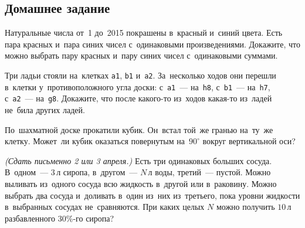 

\subsection*{Домашнее задание}



\begin{problems}

\item
Натуральные числа от~1 до~2015 покрашены в~красный и~синий цвета.
Есть пара красных и~пара синих чисел с~одинаковыми произведениями.
Докажите, что можно выбрать пару красных и~пару синих чисел с~одинаковыми
суммами.

Три ладьи стояли на~клетках \texttt{a1}, \texttt{b1} и~\texttt{a2}.
За~несколько ходов они перешли в~клетки у~противоположного угла доски:
с~\texttt{a1}~--- на~\texttt{h8},
с~\texttt{b1}~--- на~\texttt{h7},
с~\texttt{a2}~--- на~\texttt{g8}.
Докажите, что после какого-то из~ходов какая-то из~ладей не~била других ладей.

\item
По~шахматной доске прокатили кубик.
Он~встал той~же гранью на~ту~же клетку.
Может~ли кубик оказаться повернутым на~$90^\circ$ вокруг вертикальной оси?

\item
\emph{(Сдать письменно 2 или 3 апреля.)}
Есть три одинаковых больших сосуда.
В~одном~--- $3\,\text{л}$ сиропа, в~другом~--- $N\,\text{л}$ воды,
третий~--- пустой.
Можно выливать из~одного сосуда всю жидкость в~другой или в~раковину.
Можно выбрать два сосуда и~доливать в~один из~них из~третьего, пока уровни
жидкости в~выбранных сосудах не~сравняются.
При каких целых $N$ можно получить $10\,\text{л}$ разбавленного $30\%$-го
сиропа?

\end{problems}

